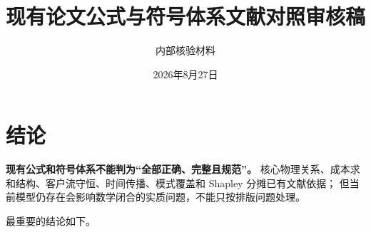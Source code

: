 \documentclass[UTF8,11pt,a4paper,fontset=none]{ctexart}
\title{现有论文公式与符号体系文献对照审核稿}
\author{内部核验材料}
\date{2026年8月27日}
\begin{document}
\maketitle

\begin{center}
\end{center}

\tableofcontents
\clearpage

\section{结论}

\textbf{现有公式和符号体系不能判为“全部正确、完整且规范”。}
核心物理关系、成本求和结构、客户流守恒、时间传播、模式覆盖和 Shapley 分摊已有文献依据；
但当前模型仍存在会影响数学闭合的实质问题，不能只按排版问题处理。

最重要的结论如下。
\end{document}
